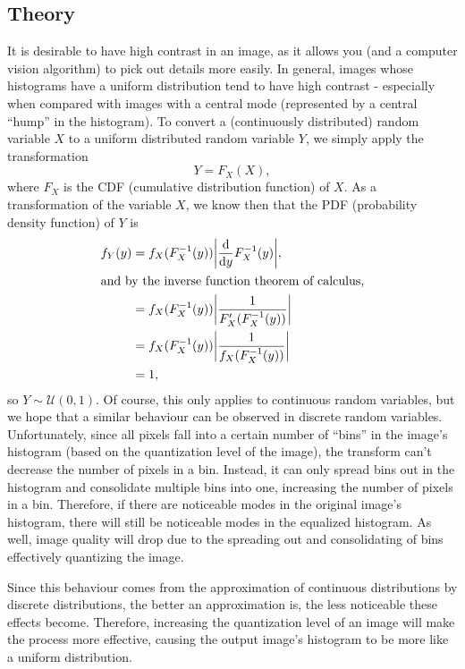 \documentclass[headings=optiontoheadandtoc,listof=totoc,parskip=full]{scrartcl}
\begin{document}
\subsection{Theory}
\label{sec:equalization-theory}
It is desirable to have high contrast in an image, as it allows you (and a computer vision algorithm) to pick out details more easily. In general, images whose histograms have a uniform distribution tend to have high contrast - especially when compared with images with a central mode (represented by a central ``hump'' in the histogram). To convert a (continuously distributed) random variable $X$ to a uniform distributed random variable $Y$, we simply apply the transformation \[
	Y = F_X(X),
\] where $F_X$ is the CDF (cumulative distribution function) of $X$. As a transformation of the variable $X$, we know then that the PDF (probability density function) of $Y$ is
\begin{align*}
	f_Y(y) &= f_X(F_X^{-1}(y)) \abs{\dv{y} F_X^{-1}(y)},\\
\intertext{and by the inverse function theorem of calculus,}
		&= f_X(F_X^{-1}(y)) \abs{\frac{1}{F_X'(F_X^{-1}(y))}}\\
		&= f_X(F_X^{-1}(y)) \abs{\frac{1}{f_X(F_X^{-1}(y))}}\\
		&= 1,
\end{align*}
so $Y \sim \mathcal U(0, 1)$. Of course, this only applies to continuous random variables, but we hope that a similar behaviour can be observed in discrete random variables. Unfortunately, since all pixels fall into a certain number of ``bins'' in the image's histogram (based on the quantization level of the image), the transform can't decrease the number of pixels in a bin. Instead, it can only spread bins out in the histogram and consolidate multiple bins into one, increasing the number of pixels in a bin. Therefore, if there are noticeable modes in the original image's histogram, there will still be noticeable modes in the equalized histogram. As well, image quality will drop due to the spreading out and consolidating of bins effectively quantizing the image. \par

Since this behaviour comes from the approximation of continuous distributions by discrete distributions, the better an approximation is, the less noticeable these effects become. Therefore, increasing the quantization level of an image will make the process more effective, causing the output image's histogram to be more like a uniform distribution.
\end{document}
